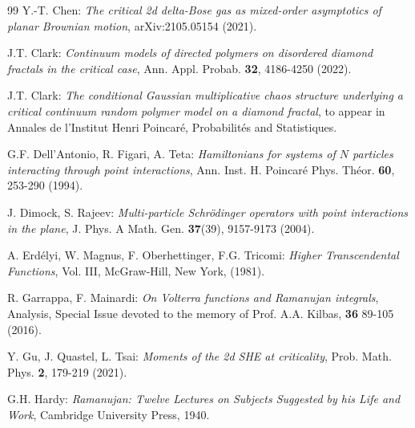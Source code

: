 \documentclass[10pt]{article}
\numberwithin{equation}{section}
\theoremstyle{definition}
\begin{document}
\begin{thebibliography}{99}
 Y.-T. Chen: \emph{The critical 2d delta-Bose gas as mixed-order asymptotics of planar Brownian motion},  \textup{arXiv:2105.05154} (2021). 





 J.T. Clark: \emph{Continuum models of directed polymers on disordered diamond fractals in the critical case},  Ann. Appl. Probab. \textbf{32}, 4186-4250  (2022).


 J.T. Clark: \emph{The conditional Gaussian multiplicative chaos   structure underlying a critical  continuum random  polymer model on a diamond fractal}, to appear in Annales de l'Institut Henri Poincar\'e, Probabilit\'es and Statistiques.

    




 G.F. Dell'Antonio, R. Figari, A. Teta:  \emph{Hamiltonians for systems of $N$ particles interacting through point interactions}, Ann. Inst. H. Poincar\'e  Phys. Th\'eor. \textbf{60},  253-290 (1994).





 J. Dimock, S. Rajeev: \emph{Multi-particle Schr\"odinger operators with point interactions in the plane}, J. Phys. A Math. Gen.  \textbf{37}(39), 9157-9173 (2004).





 A. Erd\'elyi, W. Magnus, F. Oberhettinger, F.G. Tricomi: \emph{Higher Transcendental Functions}, Vol. III,  McGraw-Hill, New York, (1981).




 R. Garrappa, F. Mainardi: \emph{On Volterra functions and Ramanujan integrals}, Analysis, Special Issue devoted to the memory of Prof. A.A. Kilbas, \textbf{36} 89-105 (2016).



 Y. Gu, J. Quastel, L. Tsai: \textit{Moments of the 2d SHE at criticality}, Prob. Math. Phys. \textbf{2}, 179-219  (2021).



 G.H. Hardy: \textit{Ramanujan: Twelve Lectures on Subjects Suggested by his Life and Work}, Cambridge University Press,  1940.










\end{thebibliography}
\end{document}
